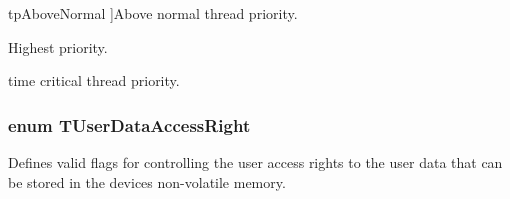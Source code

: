 \begin{Desc}
\begin{description}
{\hypertarget{group___common_interface_gga2dc400c438444996449c9d056c0883cfa66612834304014eb9689f5f49f22d2f8}{tp\+Above\+Normal}\label{group___common_interface_gga2dc400c438444996449c9d056c0883cfa66612834304014eb9689f5f49f22d2f8}
}]Above normal thread priority. \item[{\em 
\hypertarget{group___common_interface_gga2dc400c438444996449c9d056c0883cfa294056e414dfc120d476603f8888955f}{tp\+Highest}\label{group___common_interface_gga2dc400c438444996449c9d056c0883cfa294056e414dfc120d476603f8888955f}
}]Highest priority. \item[{\em 
\hypertarget{group___common_interface_gga2dc400c438444996449c9d056c0883cfa74b374c3cc82e8bbbedd386a1b556c45}{tp\+Time\+Critical}\label{group___common_interface_gga2dc400c438444996449c9d056c0883cfa74b374c3cc82e8bbbedd386a1b556c45}
}]time critical thread priority. \end{description}
\end{Desc}
\hypertarget{group___common_interface_gabda8d2f2e8458c2edb94503478dbcbfa}{
\subsubsection[{T\+User\+Data\+Access\+Right}]{\setlength{\rightskip}{0pt plus 5cm}enum {\bf T\+User\+Data\+Access\+Right}}}\label{group___common_interface_gabda8d2f2e8458c2edb94503478dbcbfa}


Defines valid flags for controlling the user access rights to the user data that can be stored in the devices non-\/volatile memory. 


